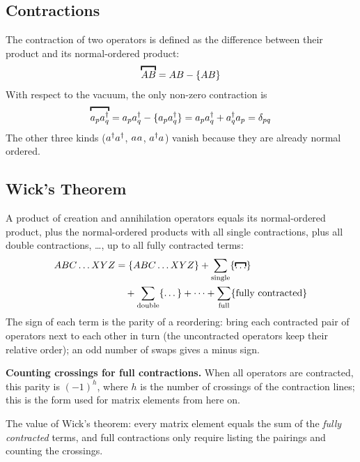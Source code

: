 \subsection{Contractions}

The contraction of two operators is defined as the difference between their product and its normal-ordered product:
\begin{align*}
\contraction{A B} = A B - \no{A B}
\end{align*}
With respect to the vacuum, the only non-zero contraction is
\begin{align*}
\contraction{a_p \cre{q}} = a_p \cre{q} - \no{a_p \cre{q}} = a_p \cre{q} + \cre{q} a_p = \delta_{pq}
\end{align*}
The other three kinds ($a_{}^\dagger a_{}^\dagger$, $a_{} a_{}$, $a_{}^\dagger a_{}$) vanish because they are already normal ordered.

\subsection{Wick's Theorem}

\begin{theorem}[Wick]
A product of creation and annihilation operators equals its normal-ordered product, plus the normal-ordered products with all single contractions, plus all double contractions, \ldots, up to all fully contracted terms:
\begin{align*}
A B C \dots X Y Z &= \no{A B C \dots X Y Z} + \sum_{\text{single}} \no{\contraction \dots} \\
&\quad + \sum_{\text{double}} \no{\dots} + \dots + \sum_{\text{full}} \no{\text{fully contracted}}
\end{align*}
The sign of each term is the parity of a reordering: bring each contracted pair of operators next to each other in turn (the uncontracted operators keep their relative order); an odd number of swaps gives a minus sign.
\end{theorem}

\textbf{Counting crossings for full contractions.} When all operators are contracted, this parity is $(-1)^h$, where $h$ is the number of crossings of the contraction lines; this is the form used for matrix elements from here on.

The value of Wick's theorem: every matrix element equals the sum of the \emph{fully contracted} terms, and full contractions only require listing the pairings and counting the crossings.

